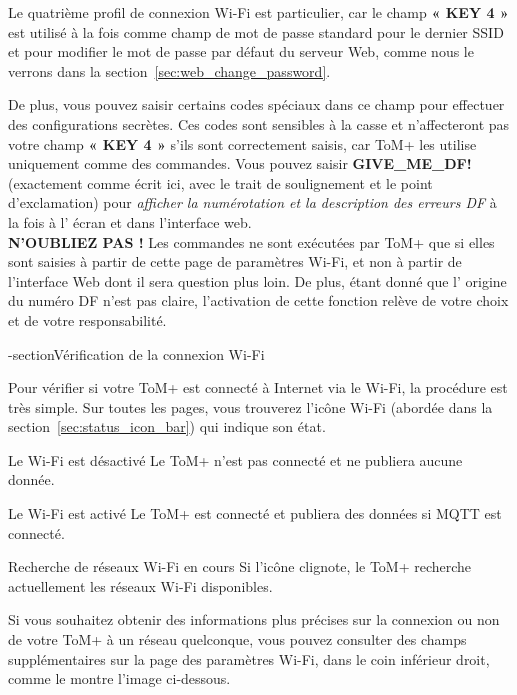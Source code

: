 Le quatrième profil de connexion Wi-Fi est particulier, car le champ \textbf{« KEY 4 »} est
utilisé à la fois comme champ de mot de passe standard pour le dernier SSID et pour modifier le mot de passe par défaut du serveur Web,
comme nous le verrons dans la section~\ref{sec:web_change_password}.

De plus, vous pouvez saisir certains codes spéciaux dans ce champ pour effectuer des
configurations secrètes. Ces codes sont sensibles à la casse et n’affecteront pas votre champ \textbf{« KEY 4 »}
s’ils sont correctement saisis, car ToM+ les utilise uniquement comme des commandes. Vous pouvez saisir
\textbf{GIVE\_ME\_DF!} (exactement comme écrit ici, avec le trait de soulignement
et le point d’exclamation) pour \textit{afficher la numérotation et la description des erreurs DF} à la fois à l’
écran et dans l’interface web.\\

\textbf{N'OUBLIEZ PAS !} Les commandes ne sont exécutées par ToM+ que si elles sont saisies à partir de
cette page de paramètres Wi-Fi, et non à partir de l’interface Web dont il sera question plus loin. De plus, étant donné que l’
origine du numéro DF n’est pas claire, l’activation de cette fonction relève de votre choix et de 
votre responsabilité.

\clearpage

\sous-section{Vérification de la connexion Wi-Fi}
\label{sec:check_wifi_connection}

Pour vérifier si votre ToM+ est connecté à Internet via le Wi-Fi, la procédure est très
simple. Sur toutes les pages, vous trouverez l’icône Wi-Fi (abordée dans la section~\ref{sec:status_icon_bar})
qui indique son état.

{Le Wi-Fi est désactivé}
{Le ToM+ n’est pas connecté et ne publiera aucune donnée.}

{Le Wi-Fi est activé}
{Le ToM+ est connecté et publiera des données si MQTT est connecté.}

{Recherche de réseaux Wi-Fi en cours}
{Si l’icône clignote, le ToM+ recherche actuellement les réseaux Wi-Fi disponibles.}

Si vous souhaitez obtenir des informations plus précises sur la connexion ou non de votre ToM+ à
un réseau quelconque, vous pouvez consulter des champs supplémentaires sur la page des paramètres Wi-Fi, dans le coin inférieur droit,
comme le montre l’image ci-dessous.

